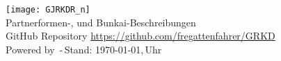 	\begin{center}
		\texttt{[image: GJRKDR\_n]}\\
		Partnerformen-, und Bunkai-Beschreibungen{\scriptsize \\\textsf{GitHub Repository \href{https://github.com/fregattenfahrer/GRKD}{https://github.com/fregattenfahrer/GRKD}} \\\textsf{Powered by} \LaTeXe \textsf{\,-\,Stand: \today,\,\currenttime Uhr}} 
	\end{center}
	
	